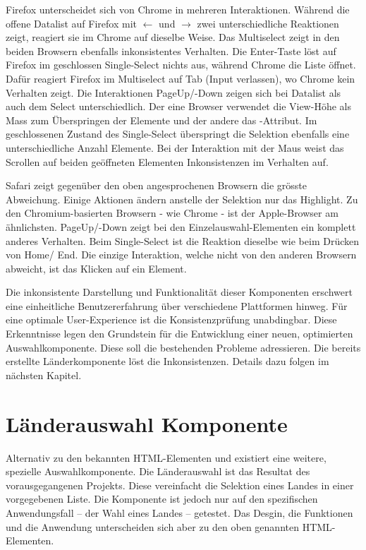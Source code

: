 Firefox unterscheidet sich von Chrome in mehreren Interaktionen. 
Während die offene Datalist auf Firefox mit $\leftarrow$ und $\rightarrow$ zwei unterschiedliche Reaktionen zeigt, reagiert sie im Chrome auf dieselbe Weise. 
Das Multiselect zeigt in den beiden Browsern ebenfalls inkonsistentes Verhalten. 
Die Enter-Taste löst auf Firefox im geschlossen Single-Select nichts aus, während Chrome die Liste öffnet. 
Dafür reagiert Firefox im Multiselect auf Tab (Input verlassen), wo Chrome kein Verhalten zeigt. 
Die Interaktionen PageUp/-Down zeigen sich bei Datalist als auch dem Select unterschiedlich. 
Der eine Browser verwendet die View-Höhe als Mass zum Überspringen der Elemente und der andere das -Attribut. 
Im geschlossenen Zustand des Single-Select überspringt die Selektion ebenfalls eine unterschiedliche Anzahl Elemente. 
Bei der Interaktion mit der Maus weist das Scrollen auf beiden geöffneten Elementen Inkonsistenzen im Verhalten auf. 

Safari zeigt gegenüber den oben angesprochenen Browsern die grösste Abweichung. 
Einige Aktionen ändern anstelle der Selektion nur das Highlight. 
Zu den Chromium-basierten Browsern - wie Chrome - ist der Apple-Browser am ähnlichsten. 
PageUp/-Down zeigt bei den Einzelauswahl-Elementen ein komplett anderes Verhalten. 
Beim Single-Select ist die Reaktion dieselbe wie beim Drücken von Home/ End. 
Die einzige Interaktion, welche nicht von den anderen Browsern abweicht, ist das Klicken auf ein Element. 

Die inkonsistente Darstellung und Funktionalität dieser Komponenten erschwert eine einheitliche Benutzererfahrung über verschiedene Plattformen hinweg. 
Für eine optimale User-Experience ist die Konsistenzprüfung unabdingbar. 
Diese Erkenntnisse legen den Grundstein für die Entwicklung einer neuen, optimierten Auswahlkomponente. 
Diese soll die bestehenden Probleme adressieren. 
Die bereits erstellte Länderkomponente löst die Inkonsistenzen. 
Details dazu folgen im nächsten Kapitel. 


\section{Länderauswahl Komponente}
\label{sec:countryChoice}

Alternativ zu den bekannten HTML-Elementen  und  existiert eine weitere, spezielle Auswahlkomponente. 
Die Länderauswahl\citemarktext{
    [\cite{ip5}]
} ist das Resultat des vorausgegangenen Projekts. 
Diese vereinfacht die Selektion eines Landes in einer vorgegebenen Liste. 
Die Komponente ist jedoch nur auf den spezifischen Anwendungsfall – der Wahl eines Landes – getestet. 
Das Desgin, die Funktionen und die Anwendung unterscheiden sich aber zu den oben genannten HTML-Elementen. 


